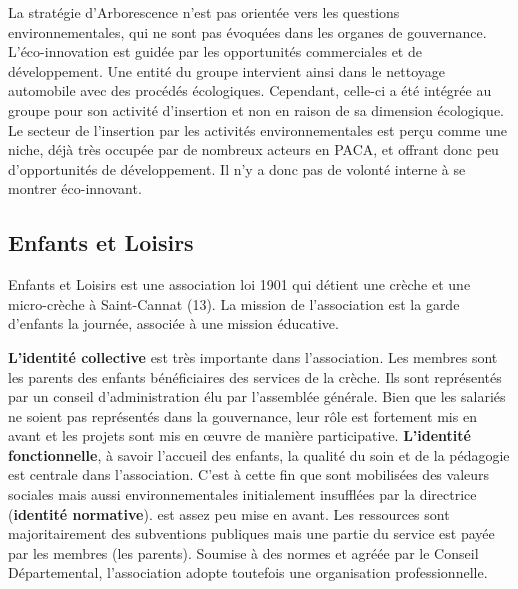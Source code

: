         La stratégie d’Arborescence n’est pas orientée vers les questions environnementales, qui ne sont pas évoquées dans les organes de gouvernance. L’éco-innovation est guidée par les opportunités commerciales et de développement. Une entité du groupe intervient ainsi dans le nettoyage automobile avec des procédés écologiques. Cependant, celle-ci a été intégrée au groupe pour son activité d’insertion et non en raison de sa dimension écologique. Le secteur de l’insertion par les activités environnementales est perçu comme une niche, déjà très occupée par de nombreux acteurs en PACA, et offrant donc peu d’opportunités de développement. Il n’y a donc pas de volonté interne à se montrer éco-innovant.


    \subsection{Enfants et Loisirs}

        Enfants et Loisirs est une association loi 1901 qui détient une crèche et une micro-crèche à Saint-Cannat (13). La mission de l’association est la garde d’enfants la journée, associée à une mission éducative.

        \textbf{L'identité collective} est très importante dans l’association. Les membres sont les parents des enfants bénéficiaires des services de la crèche. Ils sont représentés par un conseil d’administration élu par l’assemblée générale. Bien que les salariés ne soient pas représentés dans la gouvernance, leur rôle est fortement mis en avant et les projets sont mis en œuvre de manière participative. \textbf{L'identité fonctionnelle}, à savoir l'accueil des enfants, la qualité du soin et de la pédagogie est centrale dans l'association. C'est à cette fin que sont mobilisées des valeurs sociales mais aussi environnementales initialement insufflées par la directrice (\textbf{identité normative}).  est assez peu mise en avant. Les ressources sont majoritairement des subventions publiques mais une partie du service est payée par les membres (les parents). Soumise à des normes et agréée par le Conseil Départemental, l’association adopte toutefois une organisation professionnelle. \\


